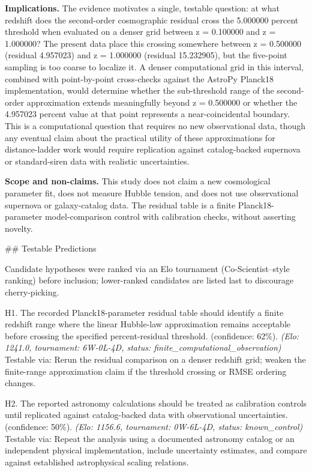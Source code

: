 \documentclass[11pt,a4paper]{article}
\begin{document}
\textbf{Implications.} The evidence motivates a single, testable question: at what redshift does the second-order cosmographic residual cross the 5.000000 percent threshold when evaluated on a denser grid between z = 0.100000 and z = 1.000000? The present data place this crossing somewhere between z = 0.500000 (residual 4.957023) and z = 1.000000 (residual 15.232905), but the five-point sampling is too coarse to localize it. A denser computational grid in this interval, combined with point-by-point cross-checks against the AstroPy Planck18 implementation, would determine whether the sub-threshold range of the second-order approximation extends meaningfully beyond z = 0.500000 or whether the 4.957023 percent value at that point represents a near-coincidental boundary. This is a computational question that requires no new observational data, though any eventual claim about the practical utility of these approximations for distance-ladder work would require replication against catalog-backed supernova or standard-siren data with realistic uncertainties.

\textbf{Scope and non-claims.} This study does not claim a new cosmological parameter fit, does not measure Hubble tension, and does not use observational supernova or galaxy-catalog data. The residual table is a finite Planck18-parameter model-comparison control with calibration checks, without asserting novelty.

\#\# Testable Predictions

Candidate hypotheses were ranked via an Elo tournament (Co-Scientist–style ranking) before inclusion; lower-ranked candidates are listed last to discourage cherry-picking.

H1. The recorded Planck18-parameter residual table should identify a finite redshift range where the linear Hubble-law approximation remains acceptable before crossing the specified percent-residual threshold. (confidence: 62\%). \textit{(Elo: 1241.0, tournament: 6W-0L-4D, status: finite\_computational\_observation)} Testable via: Rerun the residual comparison on a denser redshift grid; weaken the finite-range approximation claim if the threshold crossing or RMSE ordering changes.

H2. The reported astronomy calculations should be treated as calibration controls until replicated against catalog-backed data with observational uncertainties. (confidence: 50\%). \textit{(Elo: 1156.6, tournament: 0W-6L-4D, status: known\_control)} Testable via: Repeat the analysis using a documented astronomy catalog or an independent physical implementation, include uncertainty estimates, and compare against established astrophysical scaling relations.
\end{document}
